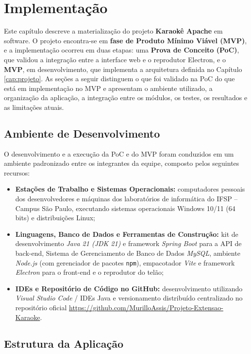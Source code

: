 \chapter{Implementação} \label{cap:implementacao}

Este capítulo descreve a materialização do projeto \textbf{Karaokê Apache} em software. O projeto encontra-se em \textbf{fase de Produto Mínimo Viável (MVP)}, e a implementação ocorreu em duas etapas: uma \textbf{Prova de Conceito (PoC)}, que validou a integração entre a interface web e o reprodutor Electron, e o \textbf{MVP}, em desenvolvimento, que implementa a arquitetura definida no Capítulo \ref{cap:projeto}. As seções a seguir distinguem o que foi validado na PoC do que está em implementação no MVP e apresentam o ambiente utilizado, a organização da aplicação, a integração entre os módulos, os testes, os resultados e as limitações atuais.

\section{Ambiente de Desenvolvimento}

O desenvolvimento e a execução da PoC e do MVP foram conduzidos em um ambiente padronizado entre os integrantes da equipe, composto pelos seguintes recursos:

\begin{itemize}
  \item \textbf{Estações de Trabalho e Sistemas Operacionais:} computadores pessoais dos desenvolvedores e máquinas dos laboratórios de informática do IFSP -- Campus São Paulo, executando sistemas operacionais Windows 10/11 (64 bits) e distribuições Linux;
  \item \textbf{Linguagens, Banco de Dados e Ferramentas de Construção:} kit de desenvolvimento \textit{Java 21 (JDK 21)} e framework \textit{Spring Boot} para a API de back-end, Sistema de Gerenciamento de Banco de Dados \textit{MySQL}, ambiente \textit{Node.js} (com gerenciador de pacotes \texttt{npm}), empacotador \textit{Vite} e framework \textit{Electron} para o front-end e o reprodutor do telão;
  \item \textbf{IDEs e Repositório de Código no GitHub:} desenvolvimento utilizando \textit{Visual Studio Code} / IDEs Java e versionamento distribuído centralizado no repositório oficial \url{https://github.com/MurilloAssis/Projeto-Extensao-Karaoke}.
\end{itemize}

\section{Estrutura da Aplicação}

